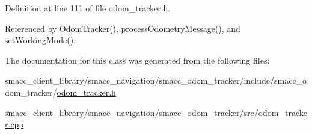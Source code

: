 Definition at line 111 of file odom\+\_\+tracker.\+h.



Referenced by Odom\+Tracker(), process\+Odometry\+Message(), and set\+Working\+Mode().



The documentation for this class was generated from the following files\+:\begin{DoxyCompactItemize}
\item 
smacc\+\_\+client\+\_\+library/smacc\+\_\+navigation/smacc\+\_\+odom\+\_\+tracker/include/smacc\+\_\+odom\+\_\+tracker/\hyperlink{odom__tracker_8h}{odom\+\_\+tracker.\+h}\item 
smacc\+\_\+client\+\_\+library/smacc\+\_\+navigation/smacc\+\_\+odom\+\_\+tracker/src/\hyperlink{odom__tracker_8cpp}{odom\+\_\+tracker.\+cpp}\end{DoxyCompactItemize}
